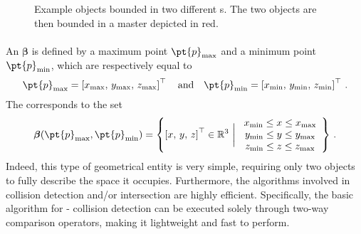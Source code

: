 \begin{figure}[!ht]
  \centering
  \def\svgwidth{9cm}
  
  \caption[Example \Collection{} objects bounded in two different \Aabb{}s.]{Example \Collection{} objects bounded in two different \Aabb{}s. The two \Aabb{} objects are then bounded in a master \Aabb{} depicted in red.}
  \label{app1:acme_collection}
\end{figure}

\paragraph{\Aabb{}}
An \Aabb{} $\boldsymbol{\beta}$ is defined by a maximum point $\pt{p}_{\max}$ and a minimum point $\pt{p}_{\min}$, which are respectively equal to
%
\begin{equation*}
  \pt{p}_{\max} = \left[x_{\max}, \, y_{\max}, \, z_{\max}\right]^{\top}
  \quad \text{and} \quad
  \pt{p}_{\min} = \left[x_{\min}, \, y_{\min}, \, z_{\min}\right]^{\top} \, \text{.}
\end{equation*}
%
The \Aabb{} corresponds to the set
%
\begin{equation*}
  \boldsymbol{\beta} (\pt{p}_{\max}, \pt{p}_{\min}) =
  \left\{
  \left[ x, \, y, \, z \right]^{\top} \in \mathbb{R}^3 ~ \bigg| ~
  \begin{array}{c}
    x_{\min} \leq x \leq x_{\max} \\
    y_{\min} \leq y \leq y_{\max} \\
    z_{\min} \leq z \leq z_{\max}
  \end{array}
  \right\} \, \text{.}
\end{equation*}
%
Indeed, this type of geometrical entity is very simple, requiring only two \Point{} objects to fully describe the space it occupies. Furthermore, the algorithms involved in \Aabb{} collision detection and/or intersection are highly efficient. Specifically, the basic algorithm for \Aabb{}-\Aabb{} collision detection can be executed solely through two-way comparison operators, making it lightweight and fast to perform.

